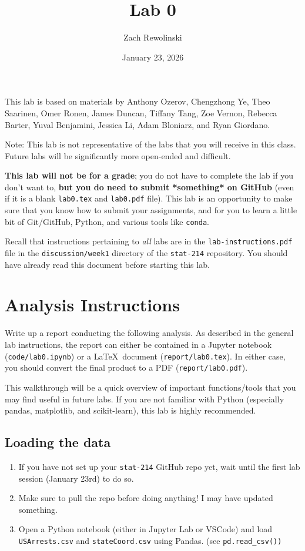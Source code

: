 \documentclass[letterpaper,12pt]{article}
\title{Lab 0}
\date{January 23, 2026}
\author{Zach Rewolinski}
\begin{document}
\maketitle

This lab is based on materials by Anthony Ozerov, Chengzhong Ye, Theo Saarinen, Omer Ronen, James Duncan, Tiffany Tang, Zoe Vernon, Rebecca Barter, Yuval Benjamini, Jessica Li, Adam Bloniarz, and Ryan Giordano.

Note: This lab is not representative of the labs that you will receive in this class. Future labs will be significantly more open-ended and difficult.

\textbf{This lab will not be for a grade}; you do not have to complete the lab if you don't want to, \textbf{but you do need to submit *something* on GitHub} (even if it is a blank \texttt{lab0.tex} and \texttt{lab0.pdf} file). This lab is an opportunity to make sure that you know how to submit your assignments, and for you to learn a little bit of Git/GitHub, Python, and various tools like \texttt{conda}.

Recall that instructions pertaining to \textit{all} labs are in the \texttt{lab-instructions.pdf} file in the \texttt{discussion/week1} directory of the \texttt{stat-214} repository. You should have already read this document before starting this lab.

\section{Analysis Instructions}

Write up a report conducting the following analysis. As described in the general lab instructions, the report can either be contained in a Jupyter notebook (\texttt{code/lab0.ipynb}) or a \LaTeX\ document (\texttt{report/lab0.tex}). In either case, you should convert the final product to a PDF (\texttt{report/lab0.pdf}).

This walkthrough will be a quick overview of important functions/tools that you may find useful in future labs. If you are not familiar with Python (especially pandas, matplotlib, and scikit-learn), this lab is highly recommended.

\subsection{Loading the data}
\begin{enumerate}
\item If you have not set up your \texttt{stat-214} GitHub repo yet, wait until the first lab session (January 23rd) to do so.
\item Make sure to pull the repo before doing anything! I may have updated something.
\item Open a Python notebook (either in Jupyter Lab or VSCode) and load \texttt{USArrests.csv} and \texttt{stateCoord.csv} using Pandas. (see \texttt{pd.read\_csv())}
\end{enumerate}
\end{document}
